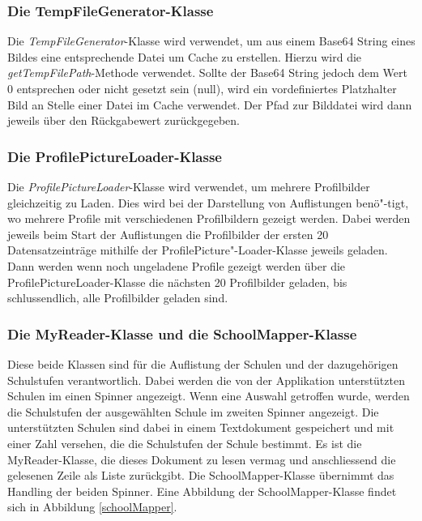 \documentclass[../main.tex]{subfiles}
\begin{document}
	\subsubsection{Die TempFileGenerator-Klasse}
	Die \emph{TempFileGenerator}-Klasse wird verwendet, um aus einem Base64 String eines Bildes eine entsprechende Datei um Cache zu erstellen. Hierzu wird die \emph{getTempFilePath}-Methode verwendet. Sollte der Base64 String jedoch dem Wert 0 entsprechen oder nicht gesetzt sein (null), wird ein vordefiniertes Platzhalter Bild an Stelle einer Datei im Cache verwendet. Der Pfad zur Bilddatei wird dann jeweils über den Rückgabewert zurückgegeben.
	
	\subsubsection{Die ProfilePictureLoader-Klasse}
	\sloppy
	Die \emph{ProfilePictureLoader}-Klasse wird verwendet, um mehrere Profilbilder gleichzeitig zu Laden. Dies wird bei der Darstellung von Auflistungen benö"-tigt, wo mehrere Profile mit verschiedenen Profilbildern gezeigt werden. Dabei werden jeweils beim Start der Auflistungen die Profilbilder der ersten 20 Datensatzeinträge mithilfe der ProfilePicture"-Loader-Klasse jeweils geladen. Dann werden wenn noch ungeladene Profile gezeigt werden über die ProfilePictureLoader-Klasse die nächsten 20 Profilbilder geladen, bis schlussendlich, alle Profilbilder geladen sind.
	\fussy
	
	\subsubsection{Die MyReader-Klasse und die SchoolMapper-Klasse}
	Diese beide Klassen sind für die Auflistung der Schulen und der dazugehörigen Schulstufen verantwortlich. Dabei werden die von der Applikation unterstützten Schulen im einen Spinner angezeigt. Wenn eine Auswahl getroffen wurde, werden die Schulstufen der ausgewählten Schule im zweiten Spinner angezeigt. Die unterstützten Schulen sind dabei in einem Textdokument gespeichert und mit einer Zahl versehen, die die Schulstufen der Schule bestimmt. Es ist die MyReader-Klasse, die dieses Dokument zu lesen vermag und anschliessend die gelesenen Zeile als Liste zurückgibt. Die SchoolMapper-Klasse übernimmt das Handling der beiden Spinner. Eine Abbildung der SchoolMapper-Klasse findet sich in Abbildung \ref{schoolMapper}.
	
\end{document}
